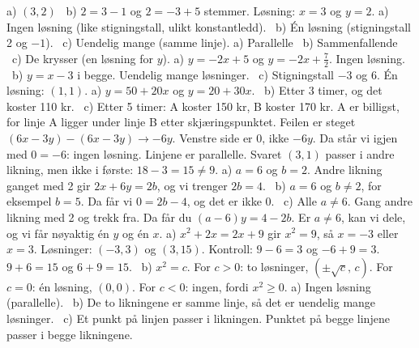  a) $(3, 2)$ \ b) $2 = 3 - 1$ og $2 = -3 + 5$ stemmer. Løsning: $x = 3$ og $y = 2$.
 a) Ingen løsning (like stigningstall, ulikt konstantledd). \ b) Én løsning (stigningstall 2 og $-1$). \ c) Uendelig mange (samme linje).
 a) Parallelle \ b) Sammenfallende \ c) De krysser (en løsning for $y$).
 a) $y = -2x + 5$ og $y = -2x + \frac{7}{2}$. Ingen løsning. \ b) $y = x - 3$ i begge. Uendelig mange løsninger. \ c) Stigningstall $-3$ og $6$. Én løsning: $(1, 1)$.
 a) $y = 50 + 20x$ og $y = 20 + 30x$. \ b) Etter 3 timer, og det koster 110 kr. \ c) Etter 5 timer: A koster 150 kr, B koster 170 kr. A er billigst, for linje A ligger under linje B etter skjæringspunktet.
 Feilen er steget $(6x - 3y) - (6x - 3y) \to -6y$. Venstre side er 0, ikke $-6y$. Da står vi igjen med $0 = -6$: ingen løsning. Linjene er parallelle.
Svaret $(3, 1)$ passer i andre likning, men ikke i første: $18 - 3 = 15 \neq 9$.
 a) $a = 6$ og $b = 2$. Andre likning ganget med 2 gir $2x + 6y = 2b$, og vi trenger $2b = 4$. \ b) $a = 6$ og $b \neq 2$, for eksempel $b = 5$. Da får vi $0 = 2b - 4$, og det er ikke 0. \ c) Alle $a \neq 6$. Gang andre likning med 2 og trekk fra. Da får du $(a - 6)y = 4 - 2b$. Er $a \neq 6$, kan vi dele, og vi får nøyaktig én $y$ og én $x$.
 a) $x^2 + 2x = 2x + 9$ gir $x^2 = 9$, så $x = -3$ eller $x = 3$. Løsninger: $(-3, 3)$ og $(3, 15)$. Kontroll: $9 - 6 = 3$ og $-6 + 9 = 3$. $9 + 6 = 15$ og $6 + 9 = 15$. \ b) $x^2 = c$. For $c > 0$: to løsninger, $(\pm\sqrt{c},\, c)$. For $c = 0$: én løsning, $(0, 0)$. For $c < 0$: ingen, fordi $x^2 \ge 0$.
 a) Ingen løsning (parallelle). \ b) De to likningene er samme linje, så det er uendelig mange løsninger. \ c) Et punkt på linjen passer i likningen. Punktet på begge linjene passer i begge likningene.

